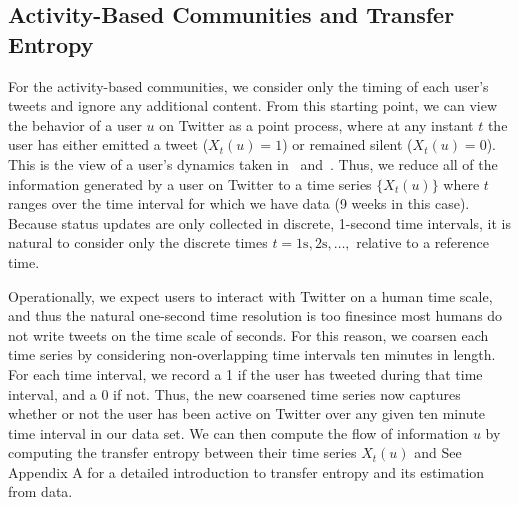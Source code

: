 \subsection{Activity-Based Communities and Transfer Entropy}
\label{sec:method-activity}






For the activity-based communities, we consider only the timing of each user's tweets and ignore any additional content. From this starting point, we can view the behavior of a user $u$ on Twitter as a point process, where at any instant $t$ the user has either emitted a tweet ($X_{t}(u) = 1$) or remained silent ($X_{t}(u) = 0$). This is the view of a user's dynamics taken in~\cite{darmon2013understanding} and~\cite{ver2012information}. Thus, we reduce all of the information generated by a user on Twitter to a time series $\{ X_{t}(u)\}$ where $t$ ranges over the time interval for which we have data (9 weeks in this case). Because status updates are only collected in discrete, 1-second time intervals, it is natural to consider only the discrete times $t = 1 \text{s}, 2 \text{s}, \ldots, $ relative to a reference time. 

Operationally, we expect users to interact with Twitter on a human time scale, and thus the natural one-second time resolution is too fine\DIFdelbegin \DIFdel{; }\DIFdelend \DIFaddbegin \DIFadd{, }\DIFaddend since most humans do not write tweets on the time scale of seconds. For this reason, we coarsen each time series by considering non-overlapping time intervals ten minutes in length. For each time interval, we record a 1 if the user has tweeted during that time interval, and a 0 if \DIFdelbegin {}\DIFdelend \DIFaddbegin {}\DIFaddend not. Thus, the new coarsened time series now captures whether or not the user has been active on Twitter over any given ten minute time interval in our data set. \DIFaddbegin {}\DIFaddend We can then compute the flow of information \DIFdelbegin {}\DIFdelend \DIFaddbegin {}\DIFaddend $u$ \DIFdelbegin {}\DIFdelend \DIFaddbegin {}\DIFaddend by computing the transfer entropy between their time series $X_{t}(u)$ and \DIFdelbegin {}\DIFdelend \DIFaddbegin {}\DIFaddend See Appendix A for a detailed introduction to transfer entropy and its estimation from data.

